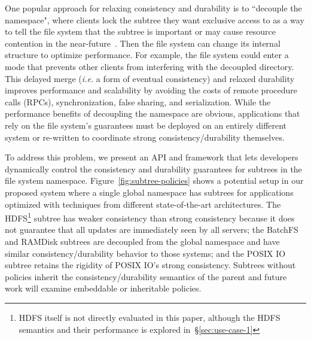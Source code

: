One popular approach for relaxing consistency and durability is to ``decouple
the namespace", where clients lock the subtree they want exclusive access to as
a way to tell the file system that the subtree is important or may cause
resource contention in the near-future~\cite{grider:pdsw2015-marfs,
zheng:pdsw2015-deltafs, zheng:pdsw2014-batchfs, ren:sc2014-indexfs,
bent:slides-twotiers}. Then the file system can change its internal structure
to optimize performance. For example, the file system could enter a mode that
prevents other clients from interfering with the decoupled directory.  This
delayed merge ({\it i.e.} a form of eventual consistency) and relaxed
durability improves performance and scalability by avoiding the costs of remote
procedure calls (RPCs), synchronization, false sharing, and serialization.
While the performance benefits of decoupling the namespace are obvious,
applications that rely on the file system's guarantees must be deployed on an
entirely different system or re-written to coordinate strong
consistency/durability themselves.

%

To address this problem, we present an API and framework that lets developers
dynamically control the consistency and durability guarantees for subtrees in
the file system namespace.  Figure~\ref{fig:subtree-policies} shows a potential
setup in our proposed system where a single global namespace has subtrees for
applications optimized with techniques from different state-of-the-art
architectures.  The HDFS\footnote{HDFS itself is not directly evaluated in this
paper, although the HDFS semantics and their performance is explored
in~\S\ref{sec:use-case-1}} subtree has weaker consistency than strong
consistency because it does not guarantee that all updates are immediately seen
by all servers; the BatchFS and RAMDisk subtrees are decoupled from the global
namespace and have similar consistency/durability behavior to those systems;
and the POSIX IO subtree retains the rigidity of POSIX IO's strong consistency.
Subtrees without policies inherit the consistency/durability semantics of the
parent and future work will examine embeddable or inheritable policies.

